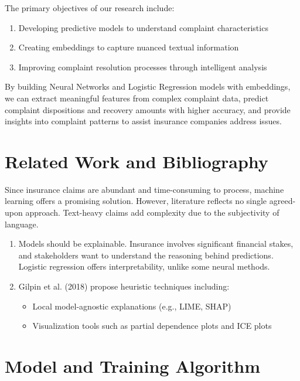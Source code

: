 \documentclass[final]{article}
\begin{document}
The primary objectives of our research include:
\begin{enumerate}
  \item Developing predictive models to understand complaint characteristics
  \item Creating embeddings to capture nuanced textual information
  \item Improving complaint resolution processes through intelligent analysis
\end{enumerate}
By building Neural Networks and Logistic Regression models with embeddings, we can extract meaningful features from complex complaint data, predict complaint dispositions and recovery amounts with higher accuracy, and provide insights into complaint patterns to assist insurance companies address issues.

\section{Related Work and Bibliography}

Since insurance claims are abundant and time-consuming to process, machine learning offers a promising solution. However, literature reflects no single agreed-upon approach. Text-heavy claims add complexity due to the subjectivity of language.

\begin{enumerate}
  \item Models should be explainable. Insurance involves significant financial stakes, and stakeholders want to understand the reasoning behind predictions. Logistic regression offers interpretability, unlike some neural methods.
  \item Gilpin et al. (2018) propose heuristic techniques including: 
  \begin{itemize}
    \item Local model-agnostic explanations (e.g., LIME, SHAP)
    \item Visualization tools such as partial dependence plots and ICE plots
  \end{itemize}
\end{enumerate}

\section{Model and Training Algorithm}
\end{document}
